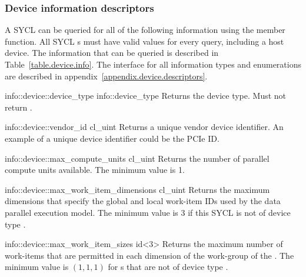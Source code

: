 \subsubsection{Device information descriptors}

A SYCL  can be queried for all of the following information using the  member function. All SYCL s must have valid values for every query, including a host device. The information that can be queried is described in Table~\ref{table.device.info}. The interface for all information types and enumerations are described in appendix~\ref{appendix.device.descriptors}.


    \addInfoRow
      {info::device::device_type} {info::device_type}
      {
        Returns the device type. Must not return .
        }

    \addInfoRow
      {info::device::vendor_id}
      {cl_uint}
      {
        Returns a unique vendor device identifier. An example of a unique
        device identifier could be the PCIe ID.
     }

    \addInfoRow
      {info::device::max_compute_units} {cl_uint}
      {
         Returns the number of parallel compute units available. 
         The minimum value is 1.
         }

    \addInfoRow
       {info::device::max_work_item_dimensions } {cl_uint}
       {
         Returns the maximum dimensions that specify the global and local work-item IDs used by the data parallel execution model.
         The minimum value is 3 if this SYCL  is not of device type .
         }

     \addInfoRow
       {info::device::max_work_item_sizes} {id<3>}
       {
         Returns the maximum number of work-items that are permitted in each
           dimension of the work-group of the . The minimum value
           is $(1, 1, 1)$ for s that are not of device type
           .
       }

